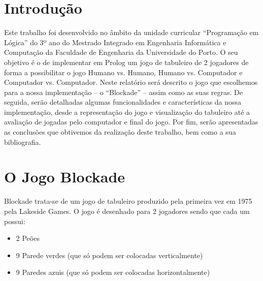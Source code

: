 \documentclass[a4paper]{article}
\begin{document}
\newpage

\tableofcontents



\newpage

\section{Introdução}


Este trabalho foi desenvolvido no âmbito da unidade curricular “Programação em Lógica” do 3º ano do Mestrado Integrado em Engenharia Informática e Computação da Faculdade de Engenharia da Universidade do Porto. O seu objetivo é o de implementar em Prolog um jogo de tabuleiro de 2 jogadores de forma a possibilitar o jogo Humano vs. Humano, Humano vs. Computador e Computador vs. Computador.
Neste relatório será descrito o jogo que escolhemos para a nossa implementação – o “Blockade” – assim como as suas regras. De seguida, serão detalhadas algumas funcionalidades e características da nossa implementação, desde a representação do jogo e visualização do tabuleiro até a avaliação de jogadas pelo computador e final do jogo. Por fim, serão apresentadas as conclusões que obtivemos da realização deste trabalho, bem como a sua bibliografia.



\newpage
\section{O Jogo Blockade}

Blockade trata-se de um jogo de tabuleiro produzido pela primeira vez em 1975 pela Lakeside Games.
O jogo é desenhado para 2 jogadores sendo que cada um possui: 

\begin{itemize}
\item 2 Peões
\item 9 Parede verdes (que só podem ser colocadas verticalmente)
\item 9 Paredes azuis (que só podem ser colocadas horizontalmente)
\end{itemize}
\end{document}
